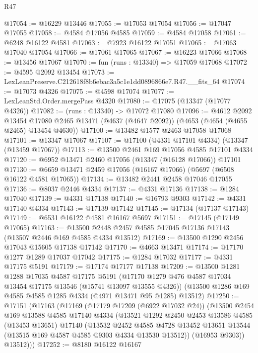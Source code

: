 \begin{lexlean}{R47}
\begin{coremodule}
@17054 := @16229 @13446
@17055 := @17053 @17054
@17056 := @17047 @17055
@17058 := @4584 @17056 @4585
@17059 := @4584 @17058
@17061 := @6248 @16122 @4581
@17063 := @7923 @16122 @17051
@17065 := @17063 @17040 @17054
@17066 := @17061 @17065
@17067 := @16223 @17066
@17068 := @13456 @17067
@17070 := fun (runs : @13340) => @17059 @17068
@17072 := @4595 @2092 @13454
@17073 := LexLeanPreserve.C212618f8b6ebac3a5c1e1dd0896866e7.R47.__fits_64
@17074 := @17073 @4326
@17075 := @4598 @17074
@17077 := LexLeanStd.Order.mergePass @4320
@17080 := @17075 (@13347 (@17077 @4326))
@17082 := (runs : @13340) -> @17072 @17080
@17096 := @4612
    @2092
    @13454
    @17080
    @2465
    @13471
    (@4637 (@4647 @2092))
    (@4653 (@4654 (@4655 @2465) @13454 @4630))
@17100 := @13482 @1577 @2463 @17058 @17068
@17101 := @13347 @17067
@17107 := @17100 (@4331 @17101 @4334) (@13347 (@13459 @17067))
@17113 := @13500 @2461 @169 @17056 @4585 @17101 @4334
@17120 := @6952 @13471 @2460 @17056 (@13347 (@16128 @17066)) @17101
@17130 := @6659 @13471 @2459 @17056 (@16167 @17066) (@5697 (@6508 @16122 @4581 @17065))
@17134 := @13482 @2441 @2458 @17046 @17055
@17136 := @8037 @2446 @4334
@17137 := @4331 @17136
@17138 := @1284 @17040
@17139 := @4331 @17138
@17140 := @16793 @9303
@17142 := @4331 @17140 @4334
@17143 := @17139 @17142
@17145 := @17134 (@17137 @17143)
@17149 := @6531 @16122 @4581 @16167 @5697
@17151 := @17145 (@17149 @17065)
@17163 := @13500 @2448 @2457 @4585 @17045 @17136 @17143 (@13507 @2446 @169 @4585 @4334 @13512)
@17169 := @13500 @1290 @2456 @17043 @15605 @17138 @17142
@17170 := @4663 @13471
@17174 := @17170 @1277 @1289 @17037 @17042
@17175 := @1284 @17032
@17177 := @4331 @17175 @5191
@17179 := @17174 @17177 @17138
@17209 := @13500
    @1281
    @1288
    @17035
    @4587
    @17175
    @5191
    (@17170 @1279 @476 @4587 @17034 @13454 @17175 @13546 (@15741 @13097 @13555 @4326))
    (@13500 @1286 @169 @4585 @4585 @1285 @4334 (@4971 @13471 @95 @1285) @13512)
@17250 := @17151
    (@17163
      (@17169
        (@17179 @17209 (@6922 @17032 @24))
        (@13500
          @2454
          @169
          @13588
          @4585
          @17140
          @4334
          (@13521
            @1292
            @2450
            @2453
            @13586
            @4585
            (@13453 @13651)
            @17140
            (@13532
              @2452
              @4585
              @4728
              @13452
              @13651
              @13544
              (@13515 @169 @4587 @4585 @9303 @4334 @13530 @13512))
            (@16953 @9303))
          @13512)))
@17252 := @8180 @16122 @16167

\end{coremodule}
\end{lexlean}
